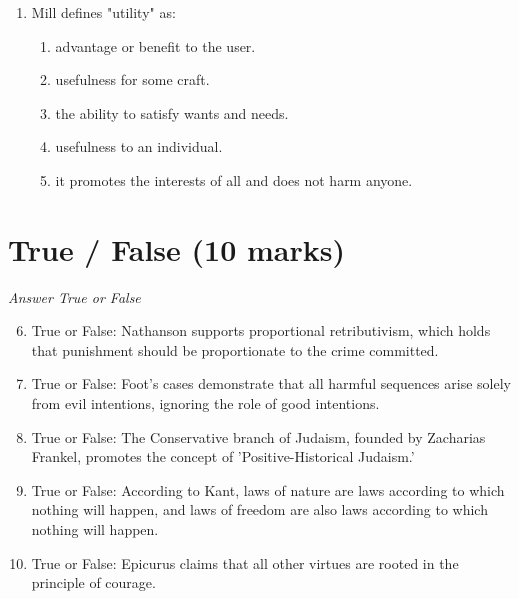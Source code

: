 \documentclass[12pt]{article}
\begin{document}
\begin{enumerate}[label=\arabic*.]
\begin{enumerate}[label=(\alph*)]
    \item strong
    \item reliant on circular reasoning
    \item too complicated
    \item overly simplistic
    \item biased in favor of Cleanthes' conclusion
\end{enumerate}
\item Mill defines "utility" as:
\begin{enumerate}[label=(\alph*)]
    \item advantage or benefit to the user.
    \item usefulness for some craft.
    \item the ability to satisfy wants and needs.
    \item usefulness to an individual.
    \item it promotes the interests of all and does not harm anyone.
\end{enumerate}
\end{enumerate}

\section*{True / False (10 marks)}
\textit{Answer True or False}
\begin{enumerate}[label=\arabic*.]
\setcounter{enumi}{5}
\item True or False: Nathanson supports proportional retributivism, which holds that punishment should be proportionate to the crime committed.
\item True or False: Foot's cases demonstrate that all harmful sequences arise solely from evil intentions, ignoring the role of good intentions.
\item True or False: The Conservative branch of Judaism, founded by Zacharias Frankel, promotes the concept of 'Positive-Historical Judaism.'
\item True or False: According to Kant, laws of nature are laws according to which nothing will happen, and laws of freedom are also laws according to which nothing will happen.
\item True or False: Epicurus claims that all other virtues are rooted in the principle of courage.
\end{enumerate}
\end{document}
